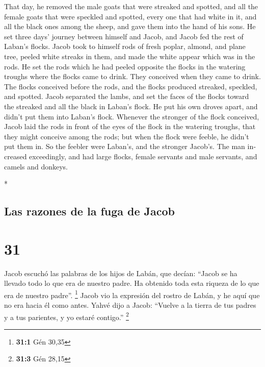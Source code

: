 \begin{paracol}{2}
\begin{otherlanguage}{english}
 That day, he removed the male goats that were streaked
and spotted, and all the female goats that were speckled and spotted,
every one that had white in it, and all the black ones among the sheep,
and gave them into the hand of his sons.  He set three
days' journey between himself and Jacob, and Jacob fed the rest of
Laban's flocks.  Jacob took to himself rods of fresh
poplar, almond, and plane tree, peeled white streaks in them, and made
the white appear which was in the rods.  He set the rods
which he had peeled opposite the flocks in the watering troughs where
the flocks came to drink. They conceived when they came to drink.
 The flocks conceived before the rods, and the flocks
produced streaked, speckled, and spotted.  Jacob
separated the lambs, and set the faces of the flocks toward the streaked
and all the black in Laban's flock. He put his own droves apart, and
didn't put them into Laban's flock.  Whenever the
stronger of the flock conceived, Jacob laid the rods in front of the
eyes of the flock in the watering troughs, that they might conceive
among the rods;  but when the flock were feeble, he
didn't put them in. So the feebler were Laban's, and the stronger
Jacob's.  The man increased exceedingly, and had large
flocks, female servants and male servants, and camels and donkeys.

\end{otherlanguage}

\switchcolumn[0]*

\hypertarget{las-razones-de-la-fuga-de-jacob}{%
\subsection{Las razones de la fuga de
Jacob}\label{las-razones-de-la-fuga-de-jacob}}

\hypertarget{section-60}{%
\section{31}\label{section-60}}

 Jacob escuchó las palabras de los hijos de Labán, que
decían: ``Jacob se ha llevado todo lo que era de nuestro padre. Ha
obtenido toda esta riqueza de lo que era de nuestro padre''. \footnote{\textbf{31:1}
  Gén 30,35}  Jacob vio la expresión del rostro de Labán,
y he aquí que no era hacia él como antes.  Yahvé dijo a
Jacob: ``Vuelve a la tierra de tus padres y a tus parientes, y yo estaré
contigo.'' \footnote{\textbf{31:3} Gén 28,15}


\end{paracol}
